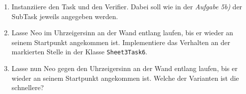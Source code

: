 

\begin{enumerate}
    \item Instanziiere den Task und den Verifier. 
        Dabei soll wie in der \textit{Aufgabe 5b)} der SubTask jeweils angegeben werden.
    \item Lasse Neo im Uhrzeigersinn an der Wand entlang laufen, bis er wieder an seinem Startpunkt angekommen ist.
        Implementiere das Verhalten an der markierten Stelle in der Klasse \lstinline{Sheet3Task6}.
    \item Lasse nun Neo gegen den Uhrzeigersinn an der Wand entlang laufen, bis er wieder an seinem Startpunkt angekommen ist.
        Welche der Varianten ist die schnellere?
\end{enumerate}


